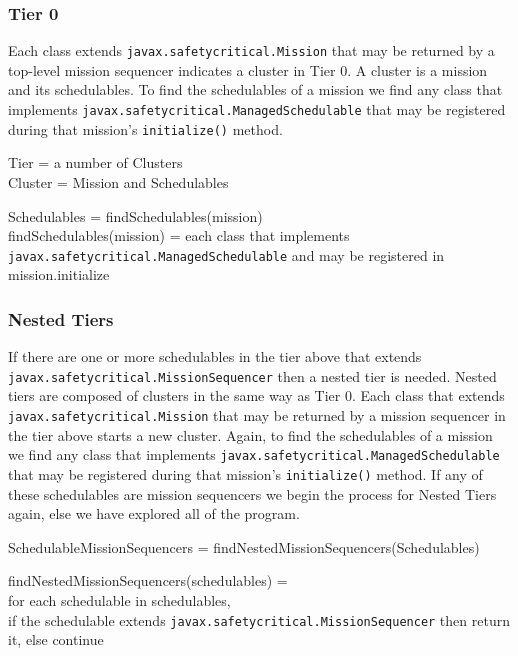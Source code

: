 \documentclass[10pt,a4paper]{article}
\newenvironment{ttSection}{\ttfamily}{\par}
\begin{document}
\subsubsection{Tier 0}
Each class extends \texttt{javax.safetycritical.Mission} that may be returned by a top-level mission sequencer indicates a cluster in Tier 0. A cluster is a mission and its schedulables. To find the schedulables of a mission we find any class that implements \texttt{javax.safetycritical.ManagedSchedulable} that may be registered during that mission's \texttt{initialize()} method. 

\begin{ttSection}
Tier = a number of Clusters\\

Cluster = Mission and Schedulables
\end{ttSection}

\begin{ttSection}
Schedulables = findSchedulables(mission)\\

findSchedulables(mission) = each class that implements \texttt{javax.safetycritical.ManagedSchedulable} and may be registered in mission.initialize
\end{ttSection}

\subsubsection{Nested Tiers}
If there are one or more schedulables in the tier above that extends \texttt{javax.safetycritical.MissionSequencer} then a nested tier is needed. Nested tiers are composed of clusters in the same way as Tier 0. Each class that extends \texttt{javax.safetycritical.Mission} that may be returned by a mission sequencer in the tier above starts a new cluster. Again, to find the schedulables of a mission we find any class that implements \texttt{javax.safetycritical.ManagedSchedulable} that may be registered during that mission's \texttt{initialize()} method. If any of these schedulables are mission sequencers we begin the process for Nested Tiers again, else we have explored all of the program.

\begin{ttSection}
SchedulableMissionSequencers = findNestedMissionSequencers(Schedulables)

findNestedMissionSequencers(schedulables) = \\
for each schedulable in schedulables, \\
if the schedulable extends \texttt{javax.safetycritical.MissionSequencer} then return it, else continue
\end{ttSection}
\end{document}
